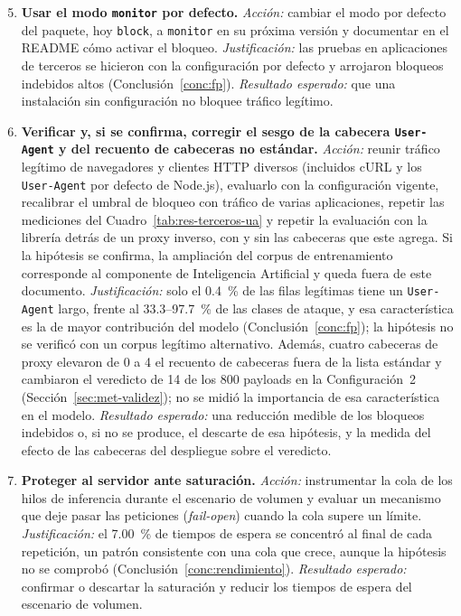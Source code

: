 \begin{enumerate}
    \setcounter{enumi}{4}
        \item \label{rec:monitor-defecto}\textbf{Usar el modo \texttt{monitor} por defecto.} \textit{Acción:} cambiar el modo por defecto del paquete, hoy \texttt{block}, a \texttt{monitor} en su próxima versión y documentar en el README cómo
    activar el bloqueo. \textit{Justificación:} las pruebas en aplicaciones de terceros se hicieron
    con la configuración por defecto y arrojaron bloqueos indebidos altos
    (Conclusión~\ref{conc:fp}). \textit{Resultado esperado:} que una instalación sin configuración
    no bloquee tráfico legítimo.

        \item \textbf{Verificar y, si se confirma, corregir el sesgo de la cabecera
    \texttt{User-Agent} y del recuento de cabeceras no estándar.} \textit{Acción:} reunir tráfico
    legítimo de navegadores y clientes HTTP diversos (incluidos cURL y los \texttt{User-Agent} por
    defecto de Node.js), evaluarlo con la configuración vigente, recalibrar el umbral de bloqueo con
    tráfico de varias aplicaciones, repetir las mediciones del Cuadro~\ref{tab:res-terceros-ua} y
    repetir la evaluación con la librería detrás de un proxy inverso, con y sin las cabeceras que este
    agrega. Si la hipótesis se confirma, la
    ampliación del corpus de entrenamiento corresponde al componente de Inteligencia Artificial y
    queda fuera de este documento. \textit{Justificación:} solo el 0.4~\% de las filas legítimas
    tiene un \texttt{User-Agent} largo, frente al 33.3--97.7~\% de las clases de ataque, y esa
    característica es la de mayor contribución del modelo (Conclusión~\ref{conc:fp}); la hipótesis
    no se verificó con un corpus legítimo alternativo. Además, cuatro cabeceras de proxy elevaron de
    0 a 4 el recuento de cabeceras fuera de la lista estándar y cambiaron el veredicto de 14 de los
    800 payloads en la Configuración~2 (Sección~\ref{sec:met-validez}); no se midió la importancia de
    esa característica en el modelo. \textit{Resultado esperado:} una reducción medible de los
    bloqueos indebidos o, si no se produce, el descarte de esa hipótesis, y la medida del efecto de
    las cabeceras del despliegue sobre el veredicto.

    \item \label{rec:cola}\textbf{Proteger al servidor ante saturación.} \textit{Acción:}
    instrumentar la cola de los hilos de inferencia durante el escenario de volumen y evaluar un
    mecanismo que deje pasar las peticiones (\textit{fail-open}) cuando la cola supere un límite.
    \textit{Justificación:} el 7.00~\% de tiempos de espera se concentró al final de cada
    repetición, un patrón consistente con una cola que crece, aunque la hipótesis no se comprobó
    (Conclusión~\ref{conc:rendimiento}). \textit{Resultado esperado:} confirmar o descartar la
    saturación y reducir los tiempos de espera del escenario de volumen.


\end{enumerate}
